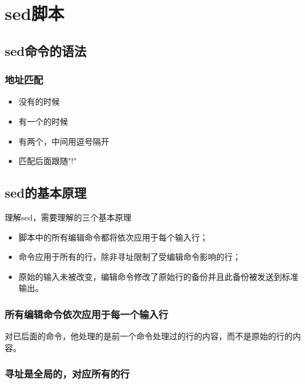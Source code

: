 
\section{sed脚本}

\subsection{sed命令的语法}

\subsubsection{地址匹配}
\begin{itemize}
\item 没有的时候
\item 有一个的时候
\item 有两个，中间用逗号隔开
\item 匹配后面跟随"!"
\end{itemize}

\subsection{sed的基本原理}

理解sed，需要理解的三个基本原理
\begin{itemize}
\item 脚本中的所有编辑命令都将依次应用于每个输入行；
\item 命令应用于所有的行，除非寻址限制了受编辑命令影响的行；
\item 原始的输入未被改变，编辑命令修改了原始行的备份并且此备份被发送到标准输出。
\end{itemize}

\subsubsection{所有编辑命令依次应用于每一个输入行}

对已后面的命令，他处理的是前一个命令处理过的行的内容，而不是原始的行的内容。


\subsubsection{寻址是全局的，对应所有的行}

